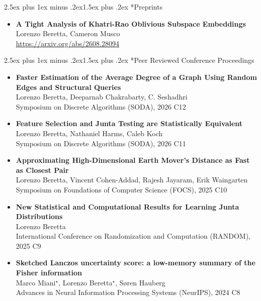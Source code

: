 \documentclass[paper=a4,fontsize=11pt]{article} %
\makeatletter
\renewcommand{\subsection}{\@startsection{subsection}{2}{0pt}%
  {2.5ex plus 1ex minus .2ex}{1.5ex plus .2ex}%
  {\normalfont\large\bfseries\color{DarkGray}}}
\makeatother
\begin{document}
\subsection*{Preprints}
\begin{itemize}[leftmargin=0.5em,itemsep=0.3em]
\item \textbf{A Tight Analysis of Khatri-Rao Oblivious Subspace Embeddings}\\
Lorenzo Beretta, Cameron Musco \\
\url{https://arxiv.org/abs/2608.28094}
\end{itemize}

\subsection*{Peer Reviewed Conference Proceedings}
\begin{itemize}[leftmargin=0.5em,itemsep=0.3em]
\item \textbf{Faster Estimation of the Average Degree of a Graph Using Random Edges and Structural Queries}\\ 
Lorenzo Beretta, Deeparnab Chakrabarty, C. Seshadhri \\
Symposium on Discrete Algorithms (SODA), 2026 \hfill C12

\item \textbf{Feature Selection and Junta Testing are Statistically Equivalent}\\ 
Lorenzo Beretta, Nathaniel Harms, Caleb Koch \\
Symposium on Discrete Algorithms (SODA), 2026 \hfill C11

\item \textbf{Approximating High-Dimensional Earth Mover's Distance as Fast as Closest Pair}\\ 
Lorenzo Beretta, Vincent Cohen-Addad, Rajesh Jayaram, Erik Waingarten \\
Symposium on Foundations of Computer Science (FOCS), 2025 \hfill C10

\item \textbf{New Statistical and Computational Results for Learning Junta Distributions}\\ 
Lorenzo Beretta \\
International Conference on Randomization and Computation (RANDOM), 2025 \hfill C9

\item \textbf{Sketched Lanczos uncertainty score: a low-memory summary of the Fisher information}\\ 
Marco Miani$^\star$, Lorenzo Beretta$^\star$, Søren Hauberg \\
Advances in Neural Information Processing Systems (NeurIPS), 2024 \hfill C8


\end{itemize}
\end{document}
